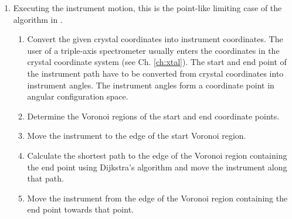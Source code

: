 \begin{enumerate}
	\item Executing the instrument motion, this is the point-like limiting case of the algorithm in \cite[p. 163]{Berg2008}.
	\begin{enumerate}
		\item Convert the given crystal coordinates into instrument coordinates.
			The user of a triple-axis spectrometer usually enters the coordinates in the crystal coordinate system
			(see Ch. \ref{ch:xtal}). The start and end point of the instrument path have to be converted from crystal
			coordinates into instrument angles. The instrument angles form a coordinate point in angular configuration
			space.
		\item Determine the Voronoi regions of the start and end coordinate points.
		\item Move the instrument to the edge of the start Voronoi region.
		\item Calculate the shortest path to the edge of the Voronoi region containing the end point using Dijkstra's algorithm and move the instrument along that path.
		\item Move the instrument from the edge of the Voronoi region containing the end point towards that point.
	\end{enumerate}
\end{enumerate}
